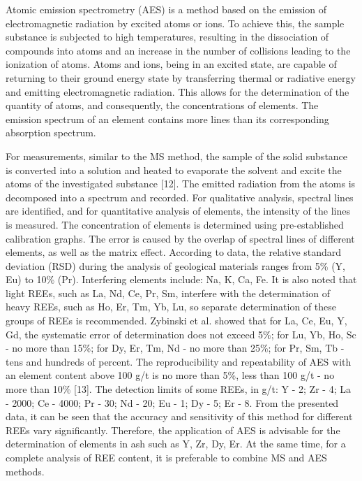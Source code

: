 Atomic emission spectrometry (AES) is a method based on the emission of
electromagnetic radiation by excited atoms or ions. To achieve this, the
sample substance is subjected to high temperatures, resulting in the
dissociation of compounds into atoms and an increase in the number of
collisions leading to the ionization of atoms. Atoms and ions, being in
an excited state, are capable of returning to their ground energy state
by transferring thermal or radiative energy and emitting electromagnetic
radiation. This allows for the determination of the quantity of atoms,
and consequently, the concentrations of elements. The emission spectrum
of an element contains more lines than its corresponding absorption
spectrum.

For measurements, similar to the MS method, the sample of the solid
substance is converted into a solution and heated to evaporate the
solvent and excite the atoms of the investigated substance {[}12{]}. The
emitted radiation from the atoms is decomposed into a spectrum and
recorded. For qualitative analysis, spectral lines are identified, and
for quantitative analysis of elements, the intensity of the lines is
measured. The concentration of elements is determined using
pre-established calibration graphs. The error is caused by the overlap
of spectral lines of different elements, as well as the matrix effect.
According to data, the relative standard deviation (RSD) during the
analysis of geological materials ranges from 5\% (Y, Eu) to 10\% (Pr).
Interfering elements include: Na, K, Ca, Fe. It is also noted that light
REEs, such as La, Nd, Ce, Pr, Sm, interfere with the determination of
heavy REEs, such as Ho, Er, Tm, Yb, Lu, so separate determination of
these groups of REEs is recommended. Zybinski et al. showed that for La,
Ce, Eu, Y, Gd, the systematic error of determination does not exceed
5\%; for Lu, Yb, Ho, Sc - no more than 15\%; for Dy, Er, Tm, Nd - no
more than 25\%; for Pr, Sm, Tb - tens and hundreds of percent. The
reproducibility and repeatability of AES with an element content above
100 g/t is no more than 5\%, less than 100 g/t - no more than 10\%
{[}13{]}. The detection limits of some REEs, in g/t: Y - 2; Zr - 4; La -
2000; Ce - 4000; Pr - 30; Nd - 20; Eu - 1; Dy - 5; Er - 8. From the
presented data, it can be seen that the accuracy and sensitivity of this
method for different REEs vary significantly. Therefore, the application
of AES is advisable for the determination of elements in ash such as Y,
Zr, Dy, Er. At the same time, for a complete analysis of REE content, it
is preferable to combine MS and AES methods.

